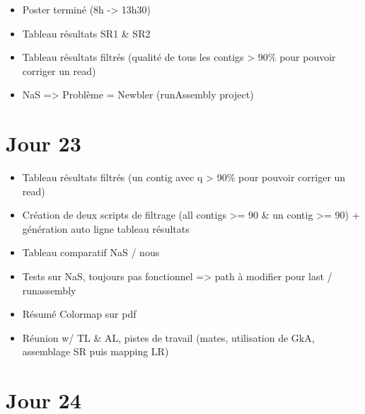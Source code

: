 \documentclass[12pt]{report}
\begin{document}
\begin{itemize}
  \item Poster terminé (8h -> 13h30)

  \item Tableau résultats SR1 \& SR2

  \item Tableau résultats filtrés (qualité de tous les contigs > 90\% pour pouvoir corriger un read)
  \item NaS => Problème = Newbler (runAssembly project)
\end{itemize}

\section{Jour 23}

\begin{itemize}
  \item Tableau résultats filtrés (un contig avec q > 90\% pour pouvoir corriger un read)

  \item Création de deux scripts de filtrage (all contigs >= 90 \& un contig >= 90) + génération auto ligne tableau résultats

  \item Tableau comparatif NaS / nous

  \item Tests sur NaS, toujours pas fonctionnel => path à modifier pour last / runassembly

  \item Résumé Colormap sur pdf

  \item Réunion w/ TL \& AL, pistes de travail (mates, utilisation de GkA, assemblage SR puis mapping LR)
\end{itemize}

\section{Jour 24}
\end{document}
